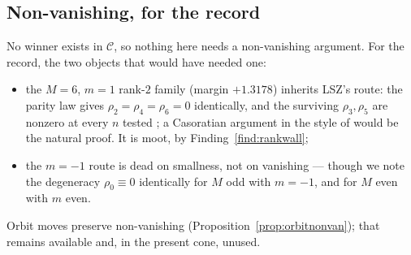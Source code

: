 \subsection{Non-vanishing, for the record}\label{ss:nonvanrecord}

No winner exists in $\mathcal C$, so nothing here needs a non-vanishing argument. For the
record, the two objects that would have needed one:
\begin{itemize}[leftmargin=1.6em,itemsep=3pt]
\item the $M=6$, $m=1$ rank-$2$ family (margin $+1.3178$) inherits LSZ's route: the parity
      law gives $\rho_2=\rho_4=\rho_6=0$ identically, and the surviving $\rho_3,\rho_5$ are
      nonzero at every $n$ tested ; a Casoratian argument in the style
      of \cite[Lemma 15(b)]{LSZ2025} would be the natural proof. It is moot, by
      Finding~\ref{find:rankwall};
\item the $m=-1$ route is dead on smallness, not on vanishing --- though we note the
      degeneracy $\rho_0\equiv0$ identically for $M$ odd with $m=-1$, and for $M$ even with
      $m$ even.
\end{itemize}
Orbit moves preserve non-vanishing (Proposition~\ref{prop:orbitnonvan}); that remains
available and, in the present cone, unused.
